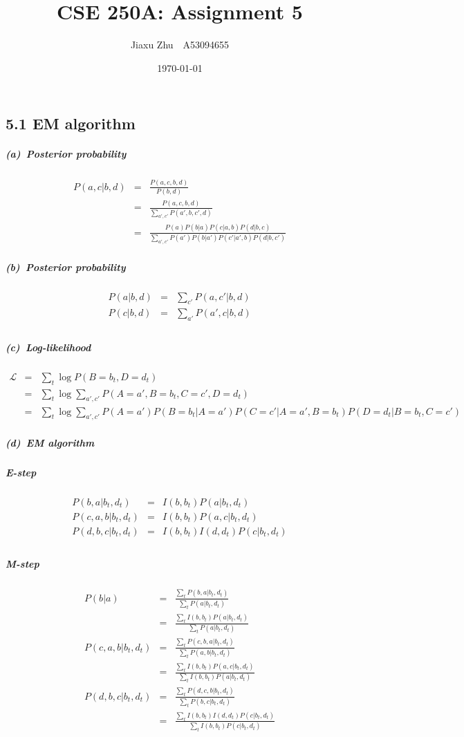 \documentclass{article}
\begin{document}
\title{CSE 250A: Assignment 5}
\author{Jiaxu Zhu~~A53094655}
\date{\today}
\maketitle
\subsection*{5.1 EM algorithm}
\subparagraph*{(a)~Posterior probability}
\begin{eqnarray*}
	P(a,c|b,d) &=& \frac{P(a,c,b,d)}{P(b,d)}\\
	&=&\frac{P(a,c,b,d)}{\sum_{a',c'}P(a',b,c',d)}\\
	&=&\frac{P(a)P(b|a)P(c|a,b)P(d|b,c)}{\sum_{a',c'}P(a')P(b|a')P(c'|a',b)P(d|b,c')}
\end{eqnarray*}

\subparagraph*{(b)~Posterior probability}
\begin{eqnarray*}
	P(a|b,d) &=& \sum_{c'}P(a,c'|b,d)\\
	P(c|b,d) &=& \sum_{a'}P(a',c|b,d)\\ 
\end{eqnarray*}

\subparagraph*{(c)~Log-likelihood}
\begin{eqnarray*}
	\mathcal{L} &=& \sum_{t}\log P(B = b_t, D = d_t)\\
	&=& \sum_{t}\log \sum_{a', c'}P(A = a', B = b_t, C = c', D = d_t)\\
	&=& \sum_{t}\log \sum_{a',c'}P(A=a')P(B=b_t|A=a')P(C=c'|A=a',B=b_t)P(D=d_t|B=b_t,C=c')
\end{eqnarray*}

\subparagraph*{(d)~EM algorithm}
\subparagraph*{E-step}
\begin{eqnarray*}
	P(b,a|b_t, d_t) &=& I(b, b_t)P(a|b_t, d_t)\\
	P(c, a, b | b_t, d_t) &=& I(b, b_t)P(a, c|b_t, d_t)\\
	P(d, b, c | b_t, d_t) &=& I(b, b_t)I(d, d_t)P(c|b_t, d_t)\\
\end{eqnarray*}
\subparagraph*{M-step}
\begin{eqnarray*}
	P(b | a) &=& \frac{\sum_{t}P(b, a|b_t, d_t)}{\sum_{t}P(a|b_t, d_t)}\\
	&=& \frac{\sum_{t}I(b, b_t)P(a|b_t, d_t)}{\sum_{t}P(a|b_t, d_t)}\\
	P(c, a, b | b_t, d_t) &=& \frac{\sum_{t}P(c, b, a|b_t, d_t)}{\sum_{t}P(a, b|b_t, d_t)}\\
	&=& \frac{\sum_{t}I(b, b_t)P(a, c|b_t, d_t)}{\sum_{t}I(b, b_t)P(a|b_t, d_t)}\\
	P(d, b, c | b_t, d_t) &=& \frac{\sum_{t}P(d, c, b|b_t, d_t)}{\sum_{t}P(b, c|b_t, d_t)}\\
	&=& \frac{\sum_{t}I(b, b_t)I(d, d_t)P(c|b_t, d_t)}{\sum_{t}I(b, b_t)P(c|b_t, d_t)}\\
\end{eqnarray*}
\end{document}
